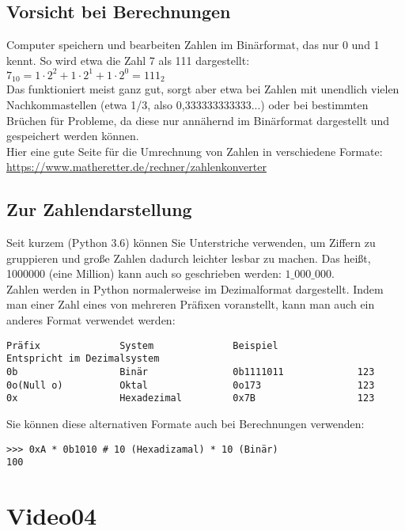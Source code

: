 \documentclass{article}
\begin{document}
\subsection{Vorsicht bei Berechnungen}
Computer speichern und bearbeiten Zahlen im Binärformat, das nur 0 und 1 kennt. So wird etwa die Zahl 7 als 111 dargestellt:\\
$7_{10}=1\cdot2^2+1\cdot2^1+1\cdot2^0=111_2$\\
Das funktioniert meist ganz gut, sorgt aber etwa bei Zahlen mit unendlich vielen Nachkommastellen (etwa 1/3, also 0,333333333333...) oder bei bestimmten Brüchen für Probleme, da diese nur annähernd im Binärformat dargestellt und gespeichert werden können.\\
Hier eine gute Seite für die Umrechnung von Zahlen in verschiedene Formate:\\
\href{https://www.matheretter.de/rechner/zahlenkonverter}{https://www.matheretter.de/rechner/zahlenkonverter}

\subsection{Zur Zahlendarstellung}
Seit kurzem (Python 3.6) können Sie Unterstriche verwenden, um Ziffern zu gruppieren und große Zahlen dadurch leichter lesbar zu machen. Das heißt, 1000000 (eine Million) kann auch so geschrieben werden: $1\_000\_000$.\\
Zahlen werden in Python normalerweise im Dezimalformat dargestellt. Indem man einer Zahl eines von mehreren Präfixen voranstellt, kann man auch ein anderes Format verwendet werden:\\
\begin{verbatim}
Präfix              System              Beispiel              Entspricht im Dezimalsystem
0b                  Binär               0b1111011             123
0o(Null o)          Oktal               0o173                 123
0x                  Hexadezimal         0x7B                  123
\end{verbatim}

\newpage

Sie können diese alternativen Formate auch bei Berechnungen verwenden:\\
\begin{verbatim}
>>> 0xA * 0b1010 # 10 (Hexadizamal) * 10 (Binär)
100
\end{verbatim}
\section{Video04}
\end{document}
